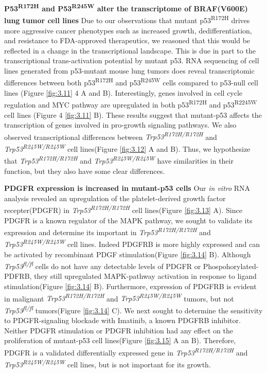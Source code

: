 \textbf{P53\textsuperscript{R172H} and P53\textsuperscript{R245W} alter the transcriptome of BRAF(V600E) lung tumor cell lines}
Due to our observations that mutant p53\textsuperscript{R172H} drives more aggressive cancer phenotypes such as increased growth, dedifferentiation, and resistance to FDA-approved therapeutics, we reasoned that this would be reflected in a change in the transcriptional landscape. This is due in part to the transcriptional trans-activation potential by mutant p53. RNA sequencing of cell lines generated from p53-mutant mouse lung tumors does reveal transcriptomic differences between both p53\textsuperscript{R172H} and p53\textsuperscript{R245W} cells compared to p53-null cell lines (Figure \ref{fig:3.11} 4 A and B). Interestingly, genes involved in cell cycle regulation and MYC pathway are upregulated in both p53\textsuperscript{R172H} and p53\textsuperscript{R2245W} cell lines (Figure 4 \ref{fig:3.11} B). These results suggest that mutant-p53 affects the transcription of genes involved in pro-growth signaling pathways. We also observed transcriptional differences between \emph{Trp53\textsuperscript{R172H/R172H}} and \emph{Trp53\textsuperscript{R245W/R245W}} cell lines(Figure \ref{fig:3.12} A and B). Thus, we hypothesize that \emph{Trp53\textsuperscript{R172H/R172H}} and \emph{Trp53\textsuperscript{R245W/R245W}} have similarities in their function, but they also have some clear differences.

\textbf{PDGFR expression is increased in mutant-p53 cells}
Our \emph{in vitro} RNA analysis revealed an upregulation of the platelet-derived growth factor recepter(PDGFR) in \emph{Trp53\textsuperscript{R172H/R172H}} cell lines(Figure \ref{fig:3.13} A). Since PDGFR is a known regulator of the MAPK pathway, we sought to validate its expression and determine its important in \emph{Trp53\textsuperscript{R172H/R172H}} and \emph{Trp53\textsuperscript{R245W/R245W}} cell lines. Indeed PDGFRB is more highly expressed and can be activated by recombinant PDGF stimulation(Figure \ref{fig:3.14} B). Although \emph{Trp53\textsuperscript{fl/fl}} cells do not have any detectable levels of PDGFR or Phospohorylated-PDFRB, they still upregulated MAPK-pathway activation in response to ligand stimulation(Figure \ref{fig:3.14} B). Furthermore, expression of PDGFRB is evident in malignant \emph{Trp53\textsuperscript{R172H/R172H}} and \emph{Trp53\textsuperscript{R245W/R245W}} tumors, but not \emph{Trp53\textsuperscript{fl/fl}} tumors(Figure \ref{fig:3.14} C). We next sought to determine the sensitivity to PDGFR-signaling blockade with Imatinib, a known PDGFRB inhibitor. Neither PDGFR stimulation or PDGFR inhibition had any effect on the proliferation of mutant-p53 cell lines(Figure \ref{fig:3.15} A an B). Therefore, PDGFR is a validated differentially expressed gene in \emph{Trp53\textsuperscript{R172H/R172H}} and \emph{Trp53\textsuperscript{R245W/R245W}} cell lines, but is not important for its growth.

